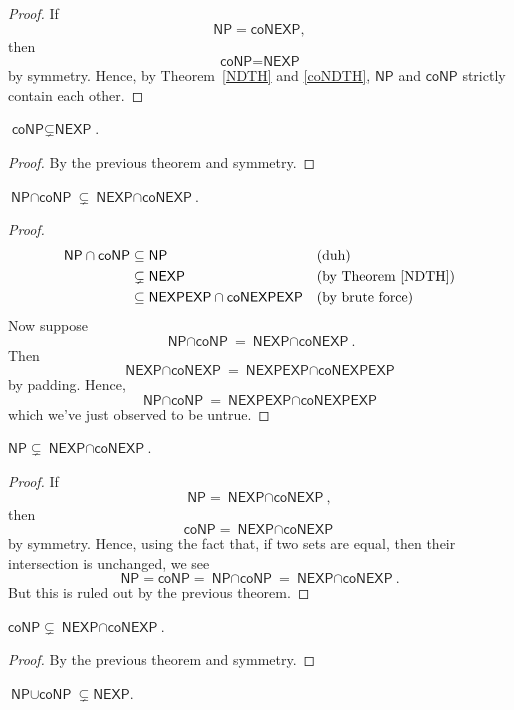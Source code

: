 \documentclass{article}
\theoremstyle{customstyle}
\newcommand{\NP}{\ensuremath{\textsf{NP}}}
\newcommand{\NEXP}{\ensuremath{\textsf{NEXP}}}
\newcommand{\coNP}{\ensuremath{\textsf{coNP}}}
\newcommand{\coNEXP}{\ensuremath{\textsf{coNEXP}}}
\newcommand{\interP}{\ensuremath{\textsf{NP}\cap\textsf{coNP}}}
\newcommand{\interEXP}{\ensuremath{\textsf{NEXP}\cap\textsf{coNEXP}}}
\newcommand{\interEXPEXP}{\ensuremath{\textsf{NEXPEXP}\cap\textsf{coNEXPEXP}}}
\newcommand{\unionP}{\ensuremath{\textsf{NP}\cup\textsf{coNP}}}
\begin{document}
\begin{proof}
If
\[
\NP = \coNEXP,
\]
then
\[
\coNP = \NEXP
\]
by symmetry. Hence, by Theorem~\ref{NDTH} and \ref{coNDTH}, $\NP$ and $\coNP$ strictly contain each other. \lightning
\end{proof}

\begin{theorem}
$\coNP\subsetneq\NEXP$.
\end{theorem}

\begin{proof}
By the previous theorem and symmetry.
\end{proof}

\begin{theorem}
$\interP \subsetneq \interEXP$.\label{interP-interEXP}
\end{theorem}

\begin{proof}
\[
\begin{aligned}
\interP & \subseteq \NP & & \text{(duh)}\\
& \subsetneq \NEXP & & \text{(by Theorem~\ref{NDTH})}\\
& \subseteq \interEXPEXP & & \text{(by brute force)}
\end{aligned}
\]
Now suppose
\[
\interP = \interEXP.
\]
Then
\[
\interEXP = \interEXPEXP
\]
by padding. Hence,
\[
\interP = \interEXPEXP
\]
which we've just observed to be untrue. \lightning
\end{proof}

\begin{theorem}
$\NP \subsetneq \interEXP$.\label{NP-interEXP}
\end{theorem}

\begin{proof}
If
\[
\NP = \interEXP,
\]
then
\[
\coNP = \interEXP
\]
by symmetry. Hence, using the fact that, if two sets are equal, then their intersection is unchanged, we see
\[
\NP = \coNP = \interP = \interEXP.
\]
But this is ruled out by the previous theorem. \lightning
\end{proof}

\begin{theorem}
$\coNP \subsetneq \interEXP$.
\end{theorem}

\begin{proof}
By the previous theorem and symmetry.
\end{proof}

\begin{theorem}
$\unionP \subsetneq \NEXP$.
\end{theorem}
\end{document}
